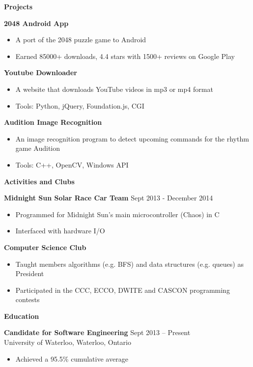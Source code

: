 \documentclass{letter}
\begin{document}
{\bfseries \Large Projects}

\vspace{-1.5mm}
{\bfseries 2048 Android App}
\vspace{-3mm}
\begin{itemize}
    \item A port of the 2048 puzzle game to Android
    \item Earned 85000+ downloads, 4.4 stars with 1500+ reviews on Google Play
\end{itemize}
\vspace{-3mm}
{\bfseries Youtube Downloader}
\vspace{-3mm}
\begin{itemize}
    \item A website that downloads YouTube videos in mp3 or mp4 format
    \item Tools: Python, jQuery, Foundation.js, CGI
\end{itemize}
\vspace{-3mm}
{\bfseries Audition Image Recognition}
\vspace{-3mm}
\begin{itemize}
    \item An image recognition program to detect upcoming commands for the rhythm game Audition
    \item Tools: C++, OpenCV, Windows API
\end{itemize}

{\bfseries \Large Activities and Clubs}

\vspace{-1.5mm}
{\bfseries Midnight Sun Solar Race Car Team} \hfill Sept 2013 - December 2014
\vspace{-3mm}
\begin{itemize}
    \item Programmed for Midnight Sun's main microcontroller (Chaos) in C
    \item Interfaced with hardware I/O
\end{itemize}
\vspace{-3mm}
{\bfseries Computer Science Club}
\vspace{-3mm}
\begin{itemize}
  \item Taught members algorithms (e.g. BFS) and data structures (e.g. queues) as President
  \item Participated in the CCC, ECCO, DWITE and CASCON programming contests
\end{itemize}

{\bfseries \Large Education}

\vspace{-1.5mm}
{\bfseries Candidate for Software Engineering} \hfill Sept 2013 -- Present \\
University of Waterloo, Waterloo, Ontario
\vspace{-3mm}
\begin{itemize}
    \item Achieved a 95.5\% cumulative average
\end{itemize}
\end{document}
